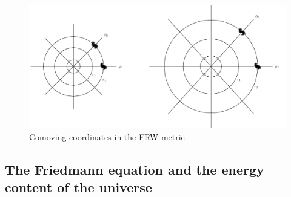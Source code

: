 \begin{figure}[ht]
\begin{center}
\includegraphics[scale=0.5]{Draw/lec6_1.png}
\end{center}
\caption{Comoving coordinates in the FRW metric}
\label{fig:lec6_1}
\end{figure}

\subsection{The Friedmann equation and the energy content of the universe}

